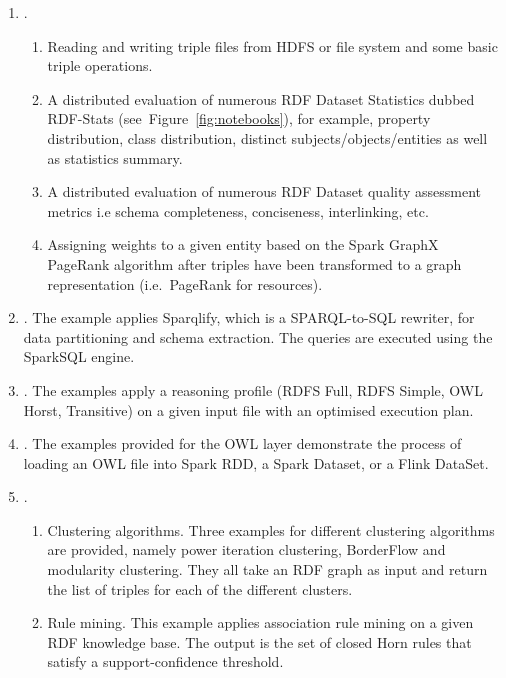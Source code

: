 \begin{enumerate}
    \item {}.
    \begin{enumerate}
      \item Reading and writing triple files from \gls{HDFS} or file system and some basic triple operations.
      \item A distributed evaluation of numerous \gls{RDF} Dataset Statistics dubbed RDF-Stats (see~Figure~\ref{fig:notebooks}), for example, property distribution, class distribution, distinct subjects/objects/entities as well as statistics summary.
      \item A distributed evaluation of numerous RDF Dataset quality assessment metrics i.e schema completeness, conciseness, interlinking, etc.
      \item Assigning weights to a given entity based on the Spark GraphX PageRank algorithm after triples have been transformed to a graph representation (i.e.~PageRank for resources).
    \end{enumerate}
    \item {}. 
    The example applies Sparqlify, which is a SPARQL-to-SQL rewriter, for data partitioning and schema extraction. The queries are executed using the SparkSQL engine.
    \item {}. The examples apply a reasoning profile (RDFS Full, RDFS Simple, \gls{OWL} Horst, Transitive) on a given input file with an optimised execution plan.
    \item {}. The examples provided for the OWL layer demonstrate the process of loading an \gls{OWL} file into Spark \gls{RDD}, a Spark Dataset, or a Flink DataSet.
    \item {}.
    \begin{enumerate}
        \item Clustering algorithms. Three examples for different clustering algorithms are provided, namely power iteration clustering, BorderFlow and modularity clustering. 
        They all take an \gls{RDF} graph as input and return the list of triples for each of the different clusters.
        \item Rule mining. This example applies association rule mining on a given RDF knowledge base. The output is the set of closed Horn rules that satisfy a support-confidence threshold.
    \end{enumerate}
\end{enumerate}

